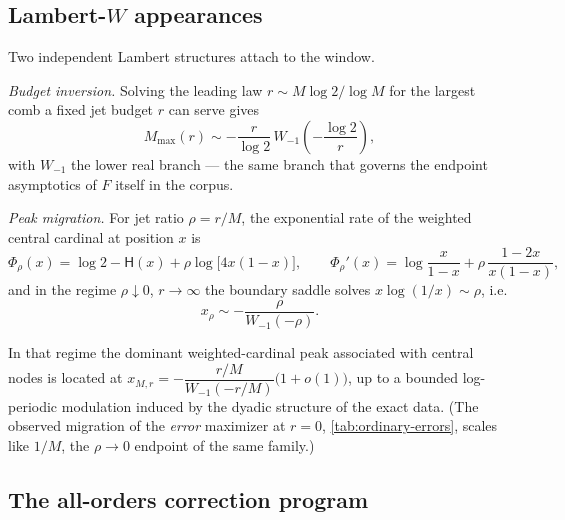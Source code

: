 \documentclass[11pt,oneside]{article}
\numberwithin{equation}{section}
\theoremstyle{definition}
\theoremstyle{remark}
\newcommand{\smallo}{o}
\newcommand{\Hyp}{\mathsf H}
\begin{document}
\subsection{Lambert-$W$ appearances}

Two independent Lambert structures attach to the window.

\emph{Budget inversion.}  Solving the leading law
$r\sim M\log2/\log M$ for the largest comb a fixed jet budget $r$ can
serve gives
\begin{equation}
 M_{\max}(r)\sim-\frac{r}{\log2}\,
 W_{-1}\!\left(-\frac{\log2}{r}\right),
 \label{eq:lambert-budget}
\end{equation}
with $W_{-1}$ the lower real branch --- the same branch that governs
the endpoint asymptotics of $F$ itself in the corpus.

\emph{Peak migration.}  For jet ratio $\rho=r/M$, the exponential
rate of the weighted central cardinal at position $x$ is
\begin{equation}
 \Phi_\rho(x)=\log2-\Hyp(x)+\rho\log\bigl[4x(1-x)\bigr],
 \qquad
 \Phi_\rho'(x)=\log\frac{x}{1-x}+\rho\,\frac{1-2x}{x(1-x)},
 \label{eq:rate-function}
\end{equation}
and in the regime $\rho\downarrow0$, $r\to\infty$ the boundary saddle
solves $x\log(1/x)\sim\rho$, i.e.
\begin{equation}
 x_\rho\sim-\frac{\rho}{W_{-1}(-\rho)}.
 \label{eq:lambert-peak}
\end{equation}

\begin{conjecture}
\label{conj:lambert-peak}
In that regime the dominant weighted-cardinal peak associated with
central nodes is located at
$x_{M,r}=-\dfrac{r/M}{W_{-1}(-r/M)}\bigl(1+\smallo(1)\bigr)$, up to a
bounded log-periodic modulation induced by the dyadic structure of the
exact data.  (The observed migration of the \emph{error} maximizer at
$r=0$, \cref{tab:ordinary-errors}, scales like $1/M$, the
$\rho\to0$ endpoint of the same family.)
\end{conjecture}

\subsection{The all-orders correction program}
\end{document}
